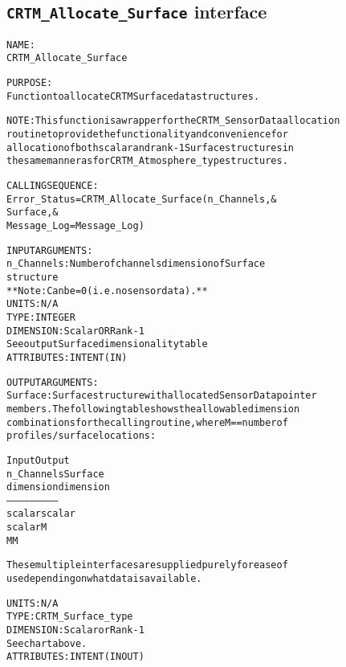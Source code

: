 \subsection{\texttt{CRTM\_Allocate\_Surface} interface}
  \label{sec:CRTM_Allocate_Surface_interface}
  \begin{alltt}
 
  NAME:
        CRTM_Allocate_Surface
  
  PURPOSE:
        Function to allocate CRTM Surface data structures.
 
        NOTE: This function is a wrapper for the CRTM_SensorData allocation 
              routine to provide the functionality and convenience for
              allocation of both scalar and rank-1 Surface structures in
              the same manner as for CRTM_Atmosphere_type structures.
 
  CALLING SEQUENCE:
        Error_Status = CRTM_Allocate_Surface( n_Channels             , &
                                              Surface                , &
                                              Message_Log=Message_Log  )
 
  INPUT ARGUMENTS:
        n_Channels:   Number of channels dimension of Surface%SensorData
                      structure
                      ** Note: Can be = 0 (i.e. no sensor data). **
                      UNITS:      N/A
                      TYPE:       INTEGER
                      DIMENSION:  Scalar OR Rank-1
                                  See output Surface dimensionality table
                      ATTRIBUTES: INTENT(IN)
 
  OUTPUT ARGUMENTS:
        Surface:      Surface structure with allocated SensorData pointer
                      members. The following table shows the allowable dimension
                      combinations for the calling routine, where M == number of
                      profiles/surface locations:
 
                         Input       Output
                       n_Channels   Surface
                        dimension   dimension
                      --------------------------
                         scalar      scalar
                         scalar        M
                           M           M
 
                      These multiple interfaces are supplied purely for ease of
                      use depending on what data is available.
                      
                      UNITS:      N/A
                      TYPE:       CRTM_Surface_type
                      DIMENSION:  Scalar or Rank-1
                                  See chart above.
                      ATTRIBUTES: INTENT(IN OUT)
 

\end{alltt}
